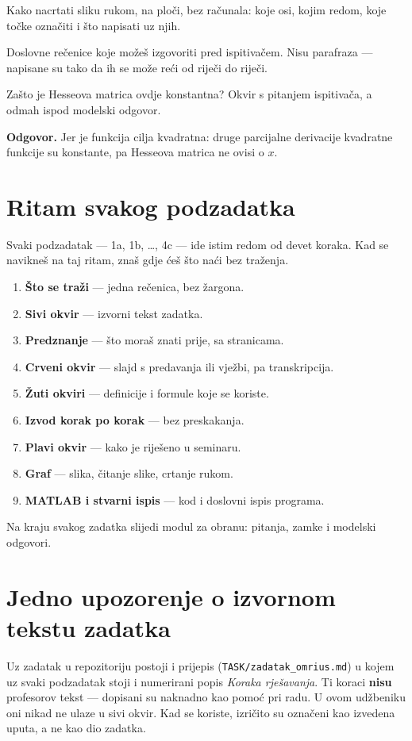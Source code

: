 \begin{ploca}
Kako nacrtati sliku rukom, na ploči, bez računala: koje osi, kojim redom, koje točke
označiti i što napisati uz njih.
\end{ploca}

\begin{izgovor}
Doslovne rečenice koje možeš izgovoriti pred ispitivačem. Nisu parafraza --- napisane
su tako da ih se može reći od riječi do riječi.
\end{izgovor}

\begin{pitanje}{Zašto je Hesseova matrica ovdje konstantna?}
Okvir s pitanjem ispitivača, a odmah ispod modelski odgovor.

\textbf{Odgovor.} Jer je funkcija cilja kvadratna: druge parcijalne derivacije
kvadratne funkcije su konstante, pa Hesseova matrica ne ovisi o $x$.
\end{pitanje}

\section{Ritam svakog podzadatka}

Svaki podzadatak --- 1a, 1b, \dots, 4c --- ide istim redom od devet koraka. Kad se
navikneš na taj ritam, znaš gdje ćeš što naći bez traženja.

\begin{enumerate}[leftmargin=*]
  \item \textbf{Što se traži} --- jedna rečenica, bez žargona.
  \item \textbf{Sivi okvir} --- izvorni tekst zadatka.
  \item \textbf{Predznanje} --- što moraš znati prije, sa stranicama.
  \item \textbf{Crveni okvir} --- slajd s predavanja ili vježbi, pa transkripcija.
  \item \textbf{Žuti okviri} --- definicije i formule koje se koriste.
  \item \textbf{Izvod korak po korak} --- bez preskakanja.
  \item \textbf{Plavi okvir} --- kako je riješeno u seminaru.
  \item \textbf{Graf} --- slika, čitanje slike, crtanje rukom.
  \item \textbf{MATLAB i stvarni ispis} --- kod i doslovni ispis programa.
\end{enumerate}

Na kraju svakog zadatka slijedi modul za obranu: pitanja, zamke i modelski odgovori.

\section{Jedno upozorenje o izvornom tekstu zadatka}

Uz zadatak u repozitoriju postoji i prijepis
(\texttt{TASK/zadatak\_omrius.md}) u kojem uz svaki podzadatak stoji i numerirani popis
\emph{Koraka rješavanja}. Ti koraci \textbf{nisu} profesorov tekst --- dopisani su
naknadno kao pomoć pri radu. U ovom udžbeniku oni nikad ne ulaze u sivi okvir. Kad se
koriste, izričito su označeni kao izvedena uputa, a ne kao dio zadatka.

